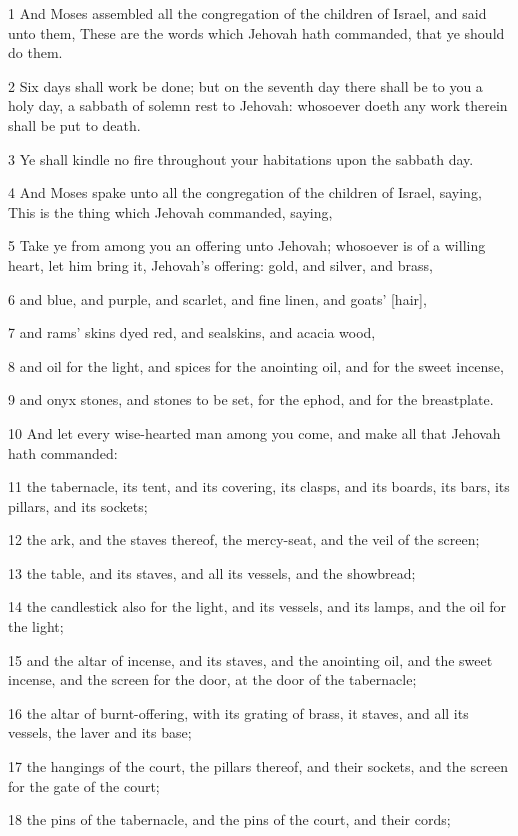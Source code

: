\par 1 And Moses assembled all the congregation of the children of Israel, and said unto them, These are the words which Jehovah hath commanded, that ye should do them.
\par 2 Six days shall work be done; but on the seventh day there shall be to you a holy day, a sabbath of solemn rest to Jehovah: whosoever doeth any work therein shall be put to death.
\par 3 Ye shall kindle no fire throughout your habitations upon the sabbath day.
\par 4 And Moses spake unto all the congregation of the children of Israel, saying, This is the thing which Jehovah commanded, saying,
\par 5 Take ye from among you an offering unto Jehovah; whosoever is of a willing heart, let him bring it, Jehovah's offering: gold, and silver, and brass,
\par 6 and blue, and purple, and scarlet, and fine linen, and goats' [hair],
\par 7 and rams' skins dyed red, and sealskins, and acacia wood,
\par 8 and oil for the light, and spices for the anointing oil, and for the sweet incense,
\par 9 and onyx stones, and stones to be set, for the ephod, and for the breastplate.
\par 10 And let every wise-hearted man among you come, and make all that Jehovah hath commanded:
\par 11 the tabernacle, its tent, and its covering, its clasps, and its boards, its bars, its pillars, and its sockets;
\par 12 the ark, and the staves thereof, the mercy-seat, and the veil of the screen;
\par 13 the table, and its staves, and all its vessels, and the showbread;
\par 14 the candlestick also for the light, and its vessels, and its lamps, and the oil for the light;
\par 15 and the altar of incense, and its staves, and the anointing oil, and the sweet incense, and the screen for the door, at the door of the tabernacle;
\par 16 the altar of burnt-offering, with its grating of brass, it staves, and all its vessels, the laver and its base;
\par 17 the hangings of the court, the pillars thereof, and their sockets, and the screen for the gate of the court;
\par 18 the pins of the tabernacle, and the pins of the court, and their cords;

